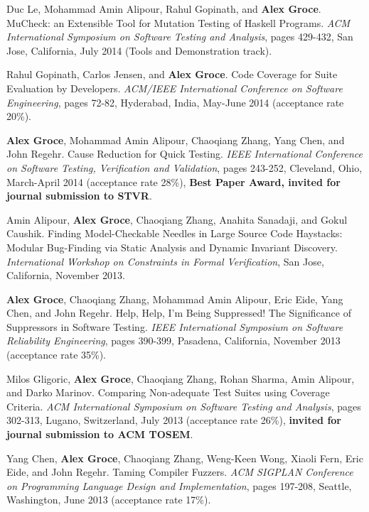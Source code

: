 \documentclass[ComputerScience]{vita}
\begin{document}
\begin{vita}
\begin{Refereed Conference and Workshop Publications}
\item
Duc Le, Mohammad Amin Alipour, Rahul Gopinath, and {\bf Alex Groce}.
\newblock MuCheck: an Extensible Tool for Mutation Testing of Haskell Programs.
\newblock \emph{ACM International Symposium on Software Testing and Analysis}, pages 429-432, San Jose, California, July 2014 (Tools and Demonstration track). 

\item
Rahul Gopinath, Carlos Jensen, and {\bf Alex Groce}.
\newblock Code Coverage for Suite Evaluation by Developers.
\newblock \emph{ACM/IEEE International Conference on Software Engineering}, pages 72-82, Hyderabad, India, May-June 2014 (acceptance rate 20\%). 

\item
{\bf Alex Groce}, Mohammad Amin Alipour, Chaoqiang Zhang, Yang Chen, and John Regehr.
\newblock Cause Reduction for Quick Testing.
\newblock \emph {IEEE International Conference on Software Testing, Verification and Validation}, pages 243-252, Cleveland, Ohio, March-April 2014 (acceptance rate 28\%), {\bf Best Paper Award, invited for journal submission to STVR}.

\item
Amin Alipour, {\bf Alex Groce}, Chaoqiang Zhang, Anahita Sanadaji, and Gokul Caushik.
\newblock Finding Model-Checkable Needles in Large Source Code Haystacks: Modular Bug-Finding via Static Analysis and Dynamic Invariant Discovery.
\newblock \emph{International Workshop on Constraints in Formal Verification}, San Jose, California, November 2013.

\item {\bf Alex Groce}, Chaoqiang Zhang, Mohammad Amin Alipour, Eric Eide, Yang Chen, and John Regehr.
\newblock Help, Help, I'm Being Suppressed! The Significance of Suppressors in Software Testing.
\newblock \emph{IEEE International Symposium on Software Reliability Engineering}, pages 390-399, Pasadena, California, November 2013 (acceptance rate 35\%).

\item Milos Gligoric, {\bf Alex Groce}, Chaoqiang Zhang, Rohan Sharma, Amin Alipour, and Darko Marinov.
\newblock Comparing Non-adequate Test Suites using Coverage Criteria.
\newblock \emph{ACM International Symposium on Software Testing and Analysis}, pages 302-313, Lugano, Switzerland, July 2013 (acceptance rate 26\%), {\bf invited for journal submission to ACM TOSEM}.

\item Yang Chen, {\bf Alex Groce}, Chaoqiang Zhang, Weng-Keen Wong, Xiaoli Fern, Eric Eide, and John Regehr.
\newblock Taming Compiler Fuzzers.
\newblock \emph{ACM SIGPLAN Conference on Programming Language Design and Implementation}, pages 197-208, Seattle, Washington, June 2013 (acceptance rate 17\%).


\end{Refereed Conference and Workshop Publications}
\end{vita}
\end{document}

